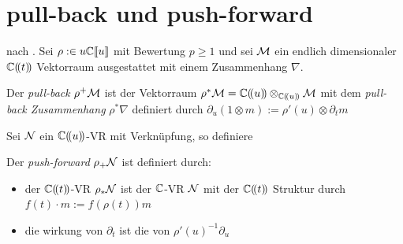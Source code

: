 \section{pull-back und push-forward}

nach \cite[1.a]{sabbah_Fourier-local}. Sei $\rho:\in u{\mathbb C\llbracket u\rrbracket}$ mit Bewertung
$p\geq1$ und sei $\mathcal{M}$ ein endlich dimensionaler $\mathbb{C}(\!(t)\!)$ Vektorraum
ausgestattet mit einem Zusammenhang $\nabla$.
\begin{defn}
  Der \emph{pull-back} $\rho^{+}\mathcal{M}$ ist der Vektorraum
  $\rho^{*}\mathcal{M}=\mathbb{C}(\!(u)\!)\otimes_{\mathbb{C}(\!(u)\!)}\mathcal{M}$ mit dem \emph{pull-back
    Zusammenhang} $\rho^*\nabla$ definiert durch $\partial_u(1\otimes
  m):=\rho'(u)\otimes\partial_tm$
\end{defn}

Sei $\mathcal{N}$ ein $\mathbb{C}(\!(u)\!)$-VR mit Verknüpfung, so definiere
\begin{defn}
  Der \emph{push-forward} $\rho_+\mathcal{N}$ ist definiert durch:
  \begin{itemize}
    \item der $\mathbb{C}(\!(t)\!)$-VR $\rho_*\mathcal{N}$ ist der $\mathbb{C}$-VR $\mathcal{N}$ mit der $\mathbb{C}(\!(t)\!)$
      Struktur durch $f(t)\cdot m:=f(\rho(t))m$
    \item die wirkung von $\partial_t$ ist die von $\rho'(u)^{-1}\partial_u$
  \end{itemize}
\end{defn}


